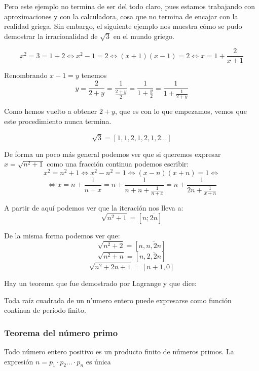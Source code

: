 \documentclass{apuntes}
\begin{document}
Pero este ejemplo no termina de ser del todo claro, pues estamos trabajando con aproximaciones y con la calculadora, cosa que no termina de encajar con la realidad griega. Sin embargo, el siguiente ejemplo nos muestra cómo se pudo demostrar la irracionalidad de $\sqrt{3}$ en el mundo griego.

\begin{example}
\[x^2=3=1+2 \iff x^2-1 = 2 \iff (x+1)(x-1) = 2 \iff x=1+\frac{2}{x+1}\]

Renombrando $x-1=y$ tenemos
\[y = \frac{2}{2+y} = \frac{1}{\frac{2+y}{2}} =\frac{1}{1+\frac{y}{2}} = \frac{1}{1+\frac{1}{2+y}}\]

Como hemos vuelto a obtener $2+y$, que es con lo que empezamos, vemos que este procedimiento nunca termina.

\[\sqrt{3}=[1,1,2,1,2,1,2...]\]

\end{example}

De forma un poco más general podemos ver que si queremos expresar $x=\sqrt{n^2+1}$ como una fracción continua podemos escribir:
\[x^2=n^2+1 \iff x^2-n^2 = 1 \iff (x-n)(x+n) = 1 \iff \]
\[\iff x = n + \frac{1}{n+x}=n+\frac{1}{n+n+\frac{1}{n+x}} = n + \frac{1}{2n + \frac{1}{x+n}}\]

A partir de aquí podemos ver que la iteración nos lleva a:
\[\sqrt{n^2+1} = [n;\overline{2n}]\]

De la misma forma podemos ver que:
\[\sqrt{n^2+2} = [n,\overline{n,2n}]\]
\[\sqrt{n^2+n} = [n,\overline{2,2n}]\]
\[\sqrt{n^2+2n+1} = [n+1, 0]\]

Hay un teorema que fue demostrado por Lagrange y que dice:
\begin{theorem}
Toda raíz cuadrada de un n'umero entero puede expresarse como función continua de período finito.
\end{theorem}

\subsubsection{Teorema del número primo}
\begin{theorem}
Todo número entero positivo es un producto finito de números primos. La expresión $n=p_1\cdot p_2 ... \cdot p_n$ es única
\end{theorem}
\end{document}
